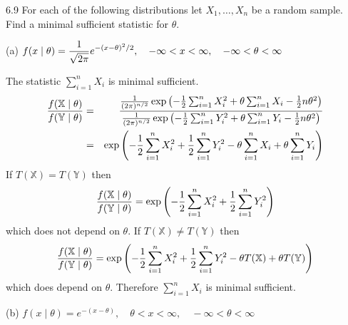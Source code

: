 \documentclass[12pt]{article}
\begin{document}
6.9
For each of the following distributions let $X_1,\ldots,X_n$
be a random sample.
Find a minimal sufficient statistic for $\theta$.

\bigskip
\noindent
(a) $\displaystyle{f(x\mid\theta)={1\over\sqrt{2\pi}}
e^{-(x-\theta)^2/2},\quad-\infty<x<\infty,\quad
-\infty<\theta<\infty}$

\bigskip
\noindent
The statistic $\sum_{i=1}^nX_i$ is minimal sufficient.
\begin{eqnarray*}
{f(\mathbb X\mid\theta)\over f(\mathbb Y\mid\theta)}
&=&{
{1\over(2\pi)^{n/2}}
\exp\left(-{1\over2}\sum_{i=1}^nX_i^2+\theta\sum_{i=1}^nX_i-
{1\over2}n\theta^2\right)
\over
{1\over(2\pi)^{n/2}}
\exp\left(-{1\over2}\sum_{i=1}^nY_i^2+\theta\sum_{i=1}^nY_i-
{1\over2}n\theta^2\right)
}\\
&=&\exp\left(
-{1\over2}\sum_{i=1}^nX_i^2
+{1\over2}\sum_{i=1}^nY_i^2
-\theta\sum_{i=1}^nX_i
+\theta\sum_{i=1}^nY_i
\right)
\end{eqnarray*}
If $T(\mathbb X)=T(\mathbb Y)$ then
$${f(\mathbb X\mid\theta)\over f(\mathbb Y\mid\theta)}
=\exp\left(
-{1\over2}\sum_{i=1}^nX_i^2
+{1\over2}\sum_{i=1}^nY_i^2
\right)
$$
which does not depend on $\theta$.
If $T(\mathbb X)\ne T(\mathbb Y)$ then
$${f(\mathbb X\mid\theta)\over f(\mathbb Y\mid\theta)}
=\exp\left(
-{1\over2}\sum_{i=1}^nX_i^2
+{1\over2}\sum_{i=1}^nY_i^2-\theta T(\mathbb X)+\theta T(\mathbb Y)
\right)
$$
which does depend on $\theta$.
Therefore $\sum_{i=1}^nX_i$ is minimal sufficient.

\bigskip
\noindent
(b) $\displaystyle{f(x\mid\theta)=e^{-(x-\theta)},
\quad\theta<x<\infty,\quad-\infty<\theta<\infty}$
\end{document}
